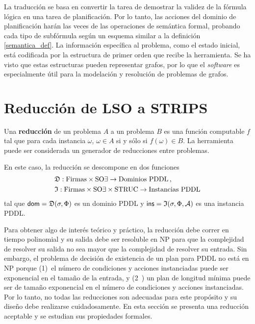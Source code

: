 La traducción se basa en convertir la tarea de demostrar la validez de la
fórmula lógica en una tarea de planificación. Por lo tanto, las acciones del
dominio de planificación harán las veces de las operaciones de semántica
formal, probando cada tipo de subfórmula según un esquema similar a la
definición \ref{semantica_def}. La información específica al problema, como el
estado inicial, está codificada por la estructura de primer orden que recibe la
herramienta. Se ha visto que estas estructuras pueden representar grafos, por lo
que el \textit{software} es especialmente útil para la modelación y resolución
de problemas de grafos.

\section{Reducción de LSO a STRIPS}
Una \textbf{reducción} de un problema $A$ a un problema $B$ es una función
computable $f$ tal que para cada instancia
$\omega$, $\omega\in A$ si y sólo si $f(\omega)\in B$.
La herramienta puede ser considerada un generador de reducciones entre problemas.

En este caso, la reducción se descompone en dos funciones
\begin{alignat*}{1}
&\mathfrak{D}: \text{Firmas} \times \text{SO}\exists \rightarrow \text{Dominios PDDL}\,, \\
&\mathfrak{I}: \text{Firmas} \times \text{SO}\exists \times \text{STRUC} \rightarrow \text{Instancias PDDL}
\end{alignat*}
tal que $\mathsf{dom}=\mathfrak{D}(\sigma,\Phi)$ es un dominio PDDL
y $\mathsf{ins}=\mathfrak{I}(\sigma,\Phi,\mathcal{A})$ es una instancia PDDL.

Para obtener algo de interés teórico y práctico, la reducción debe correr en
tiempo polinomial y su salida debe ser resoluble en NP para que la complejidad
de resolver su salida no sea mayor que la complejidad de resolver su entrada.
Sin embargo, el problema de decisión de existencia de un plan para PDDL no está
en NP porque (1)~el número de condiciones y acciones instanciadas puede ser
exponencial en el tamaño de la entrada, y (2~) un plan de longitud mínima puede
ser de tamaño exponencial en el número de condiciones y acciones instanciadas.
Por lo tanto, no todas las reducciones son adecuadas para este propósito y su
diseño debe realizarse cuidadosamente. En esta sección se
presenta una reducción aceptable y se estudian sus propiedades formales.

%

